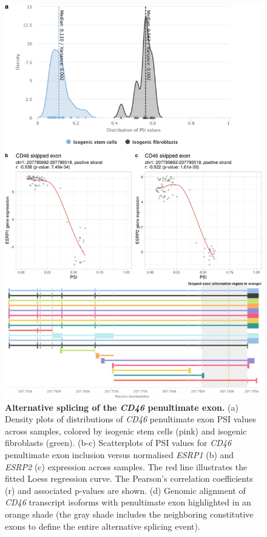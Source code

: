 \begin{figure}[!p]
  \includegraphics[width=.85\textwidth]{images/psichomics/7-cd46-as}
  \centering
  \caption[Alternative splicing of the \emph{CD46} penultimate exon]{\textbf{Alternative splicing of the \emph{CD46} penultimate exon.} (a) Density plots of distributions of \emph{CD46} penultimate exon PSI values across samples, colored by isogenic stem cells (pink) and isogenic fibroblasts (green). (b-c) Scatterplots of PSI values for \emph{CD46} penultimate exon inclusion versus normalised \emph{ESRP1} (b) and \emph{ESRP2} (c) expression across samples. The red line illustrates the fitted Loess regression curve. The Pearson’s correlation coefficients (r) and associated p-values are shown. (d) Genomic alignment of \emph{CD46} transcript isoforms with penultimate exon highlighted in an orange shade (the gray shade includes the neighboring constitutive exons to define the entire alternative splicing event).}
  \label{fig:psichomics-cd46-as}
\end{figure}

